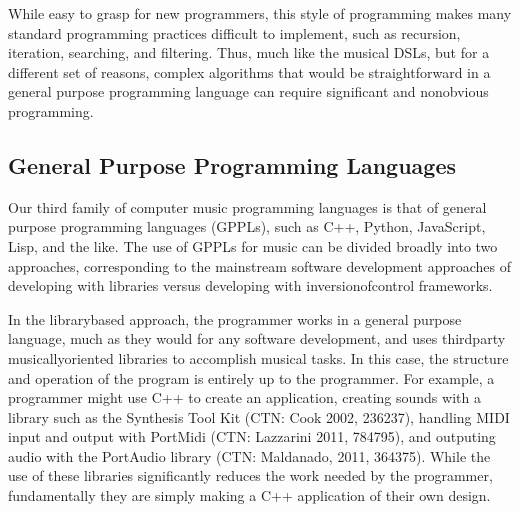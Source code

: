 \documentclass[letterpaper,10pt,english]{sphinxmanual}
\begin{document}
\sphinxAtStartPar
While easy to grasp for new programmers,
this style of programming makes many standard programming practices difficult to implement,
such as recursion, iteration, searching, and filtering.
Thus, much like the musical DSLs, but for a different set of reasons, complex
algorithms that would be straightforward in a general purpose programming language can require
significant and non\sphinxhyphen{}obvious programming.


\subsection{General Purpose Programming Languages}
\label{\detokenize{background:general-purpose-programming-languages}}
\sphinxAtStartPar
Our third family of computer music programming languages is that of
general purpose programming languages (GPPLs), such as C++, Python, JavaScript, Lisp, and the like.
The use of GPPLs for music can be divided broadly
into two approaches, corresponding to the mainstream software development
approaches of developing with libraries versus developing with
inversion\sphinxhyphen{}of\sphinxhyphen{}control frameworks.

\sphinxAtStartPar
In the library\sphinxhyphen{}based approach, the programmer works in a general purpose language,
much as they would for any software development, and uses third\sphinxhyphen{}party
musically\sphinxhyphen{}oriented libraries to accomplish musical tasks.
In this case, the structure and operation of the program is entirely up to the programmer.
For example, a programmer might use C++ to create an application, creating sounds
with a library such as the Synthesis Tool Kit (CTN: Cook 2002, 236\sphinxhyphen{}237),
handling MIDI input and output with PortMidi (CTN: Lazzarini 2011, 784\sphinxhyphen{}795),
and outputing audio with the PortAudio library (CTN: Maldanado, 2011, 364\sphinxhyphen{}375).
While the use of these libraries significantly reduces the work needed by the programmer,
fundamentally they are simply making a C++ application of their own design.
\end{document}
